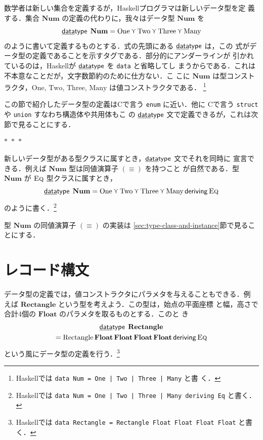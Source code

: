 \documentclass[a5paper,twoside,fleqn,draft]{jsbook}
\newcommand{\separator}{\begin{center}$*$~$*$~$*$\end{center}}
\newcommand{\programminglanguage}[1]{\textsf{#1}}
\newcommand{\clang}{\programminglanguage{C}}
\newcommand{\haskell}{\programminglanguage{Haskell}}
\newcommand{\keyword}[1]{{\underline{\textbf{#1}}}}
\newcommand{\code}[1]{\texttt{#1}}
\newcommand{\mKeyword}[1]{\mathsf{#1}}
\newcommand{\mKeywordUnderline}[1]{\text{\underline{\textsf{#1}}}}
\newcommand{\mDataTypeKeyword}{\mKeywordUnderline{data}\mKeyword{type}}
\newcommand{\mDerivingKeyword}{\mKeyword{deriving}}
\DeclareMathOperator{\mDataType}{\mDataTypeKeyword}
\DeclareMathOperator{\mDeriving}{\mDerivingKeyword}
\newcommand{\mSpecialConstant}[1]{\textrm{#1}}
\newcommand{\mNumOne}{\mSpecialConstant{One}}
\newcommand{\mNumTwo}{\mSpecialConstant{Two}}
\newcommand{\mNumThree}{\mSpecialConstant{Three}}
\newcommand{\mNumMany}{\mSpecialConstant{Many}}
\DeclareMathOperator{\mValueOr}{\curlyvee}
\newcommand{\mSet}[1]{\mathbf{#1}}
\newcommand{\mType}[1]{\mathbf{#1}} %
\newcommand{\mFloatType}{\mType{Float}}
\newcommand{\mValueConstructor}[1]{\mathrm{#1}}
\newcommand{\mValueWith}[2]{\mValueConstructor{#1}\,#2}
\newcommand{\mTypeClass}[1]{\textsc{#1}} %
\newcommand{\mEqTypeClass}{\mTypeClass{Eq}}
\begin{document}
数学者は新しい集合を定義するが，\haskell プログラマは新しいデータ型を定
義する．集合 $\mSet{Num}$ の定義の代わりに，我々はデータ型
$\mType{Num}$ を
\begin{equation}
  \mDataType\;\mType{Num}
  =\mNumOne\mValueOr\mNumTwo\mValueOr\mNumThree\mValueOr\mNumMany
\end{equation}
のように書いて定義するものとする．式の先頭にある $\mDataType$ は，この
式がデータ型の定義であることを示すタグである．部分的にアンダーラインが
引かれているのは，\haskell が $\mDataType$ を \code{data} と省略してし
まうからである．これは不本意なことだが，文字数節約のために仕方ない．こ
こに $\mSet{Num}$ は型コンストラクタ，$\mNumOne$, $\mNumTwo$,
$\mNumThree$, $\mNumMany$ は値コンストラクタである．
\footnote{\haskell では \code{data Num = One | Two | Three | Many} と書
  く．}


この節で紹介したデータ型の定義は\clang で言う \code{enum} に近い．他に
\clang で言う \code{struct} や \code{union} すなわち構造体や共用体もこ
の $\mDataType$ 文で定義できるが，これは次節で見ることにする．

\separator

新しいデータ型がある型クラスに属すとき，$\mDataType$ 文でそれを同時に
宣言できる．例えば $\mType{Num}$ 型は同値演算子 $(\equiv)$ を持つこと
が自然である．型 $\mType{Num}$ が $\mEqTypeClass$ 型クラスに属すとき，
\begin{equation}
  \mDataType\;
  \mType{Num}
  =\mNumOne\mValueOr\mNumTwo\mValueOr\mNumThree\mValueOr\mNumMany
  \mDeriving\mEqTypeClass
\end{equation}
のように書く．\footnote{\haskell では \code{data Num = One | Two |
Three | Many deriving Eq} と書く．}

型 $\mType{Num}$ の同値演算子 $(\equiv)$ の実装は
\ref{sec:type-class-and-instance}節で見ることにする．

\section{レコード構文}

データ型の定義では，値コンストラクタにパラメタを与えることもできる．例
えば $\mType{Rectangle}$ という型を考えよう．この型は，始点の平面座標
と幅，高さで合計4個の $\mFloatType$ のパラメタを取るものとする．このと
き
\begin{multline}
  \label{eq:rectangle}
  \mDataType\;
  \mType{Rectangle}\\
  =\mValueWith{Rectangle}
  {\mFloatType\,\mFloatType\,\mFloatType\,\mFloatType}
  \mDeriving\mEqTypeClass
\end{multline}
という風にデータ型の定義を行う．\footnote{\haskell では \code{data
Rectangle = Rectangle Float Float Float Float} と書く．}
\end{document}

